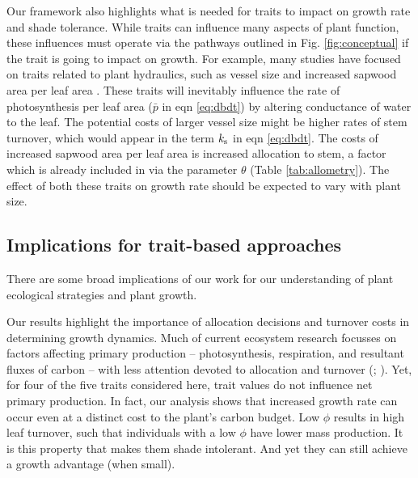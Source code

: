 \documentclass[9pt,twocolumn,twoside,lineno]{pnas-new}
\begin{document}
Our framework also highlights what is needed for traits to impact on growth rate and shade tolerance. While traits can influence many aspects of plant function, these influences must operate via the pathways outlined in Fig. \ref{fig:conceptual} if the trait is going to impact on growth. For example, many studies have focused on traits related to plant hydraulics, such as vessel size and increased sapwood area per leaf area \citep{Zanne-2010}. These traits will inevitably influence the rate of photosynthesis per leaf area ($\bar{p}$ in eqn \ref{eq:dbdt}) by altering conductance of water to the leaf. The potential costs of larger vessel size might be higher rates of stem turnover, which would appear in the term $k_{\rm s}$ in eqn \ref{eq:dbdt}. The costs of increased sapwood area per leaf area is increased allocation to stem, a factor which is already included in via the parameter $\theta$ (Table \ref{tab:allometry}). The effect of both these traits on growth rate should be expected to vary with plant size.

\subsection{Implications for trait-based approaches}
There are some broad implications of our work for our understanding of plant ecological strategies and plant growth.

Our results highlight the importance of allocation decisions and turnover costs in determining growth dynamics. Much of current ecosystem research focusses on factors affecting primary production -- photosynthesis, respiration, and resultant fluxes of carbon -- with less attention devoted to allocation and turnover (\citealp{Friend-2014}; \citealp[for comparisons of models see][]{Sitch-2008, DeKauwe-2014}). Yet, for four of the five traits considered here, trait values do not influence net primary production. In fact, our analysis  shows that increased growth rate can occur even at a distinct cost to the plant's carbon budget. Low $\phi$ results in high leaf turnover, such that individuals with a low $\phi$ have lower mass production. It is this property that makes them shade intolerant. And yet they can still achieve a growth advantage (when small).
\end{document}
